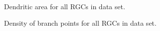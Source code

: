 \documentclass{article}
\begin{document}
\begin{figure}
  \centering
  \caption{Dendritic area for all RGCs in data set.}
\end{figure}

\clearpage

\begin{figure}
  \centering
  \caption{Density of branch points for all RGCs in data set.}
\end{figure}

\clearpage
\end{document}

